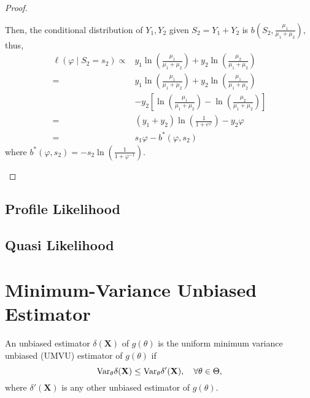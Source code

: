 \begin{proof}
\begin{enumerate}
		      Then, the conditional distribution of \(Y_{1},Y_{2}\) given \(S_{2}=Y_{1}+Y_{2}\) is \(b\left(S_{2},\frac{\mu_{1}}{\mu_{1}+\mu_{2}}\right)\), thus,
		      \begin{equation*}
			      \begin{aligned}
				      \ell\left(\varphi\mid S_{2}=s_{2}\right)\propto & y_{1}\ln\left(\frac{\mu_{1}}{\mu_{1}+\mu_{2}}\right)+y_{2}\ln\left(\frac{\mu_{2}}{\mu_{1}+\mu_{2}}\right)          \\
				      =                                               & y_{1}\ln\left(\frac{\mu_{1}}{\mu_{1}+\mu_{2}}\right)+y_{2}\ln\left(\frac{\mu_{1}}{\mu_{1}+\mu_{2}}\right)          \\
				                                                      & -y_{2}\left[\ln\left(\frac{\mu_{1}}{\mu_{1}+\mu_{2}}\right)-\ln\left(\frac{\mu_{2}}{\mu_{1}+\mu_{2}}\right)\right] \\
				      =                                               & \left(y_{1}+y_{2}\right)\ln\left(\frac{1}{1+e^{\varphi}}\right)-y_{2}\varphi                                       \\
				      =                                               & s_{1}\varphi-b^{*}\left(\varphi,s_{2}\right)
			      \end{aligned}
		      \end{equation*}
		      where \(b^{*}\left(\varphi,s_{2}\right)=-s_{2}\ln\left(\frac{1}{1+\varphi^{-1}}\right)\).
	\end{enumerate}
\end{proof}

\subsection{Profile Likelihood}

\subsection{Quasi Likelihood}

\section{Minimum-Variance Unbiased Estimator}

\begin{definition}
	An unbiased estimator \(\delta(\textbf{X})\) of \(g(\theta)\) is the uniform minimum variance unbiased (UMVU) estimator of \(g(\theta)\) if
	\begin{equation}
		\mathrm{Var}_{\theta}\delta(\textbf{X})\leq\mathrm{Var}_{\theta}\delta'(\textbf{X}),\quad\forall\theta\in\Theta,
	\end{equation}
	where \(\delta'(\textbf{X})\) is any other unbiased estimator of \(g(\theta)\).
\end{definition}

